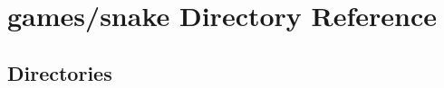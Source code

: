 \section{games/snake Directory Reference}
\label{dir_00b2eb4779470b4329a50682f6c1cc58}
\subsection*{Directories}
\begin{DoxyCompactItemize}
\end{DoxyCompactItemize}
